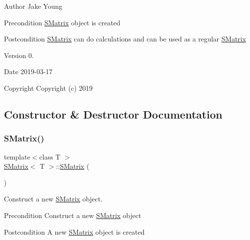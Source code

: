 \begin{DoxyAuthor}{Author}
Jake Young 
\end{DoxyAuthor}
\begin{DoxyPrecond}{Precondition}
\mbox{\hyperlink{class_s_matrix}{S\+Matrix}} object is created 
\end{DoxyPrecond}
\begin{DoxyPostcond}{Postcondition}
\mbox{\hyperlink{class_s_matrix}{S\+Matrix}} can do calculations and can be used as a regular \mbox{\hyperlink{class_s_matrix}{S\+Matrix}} 
\end{DoxyPostcond}
\begin{DoxyVersion}{Version}
0. 
\end{DoxyVersion}
\begin{DoxyDate}{Date}
2019-\/03-\/17
\end{DoxyDate}
\begin{DoxyCopyright}{Copyright}
Copyright (c) 2019 
\end{DoxyCopyright}


\subsection{Constructor \& Destructor Documentation}
\mbox{\label{class_s_matrix_a4c04fdf4ceaf5f5a27694d6dbe825eb5}} 
\subsubsection{\texorpdfstring{SMatrix()}{SMatrix()}\hspace{0.1cm}{\footnotesize\ttfamily [1/4]}}
{\footnotesize\ttfamily template$<$class T $>$ \\
\mbox{\hyperlink{class_s_matrix}{S\+Matrix}}$<$ T $>$\+::\mbox{\hyperlink{class_s_matrix}{S\+Matrix}} (\begin{DoxyParamCaption}{ }\end{DoxyParamCaption})}



Construct a new \mbox{\hyperlink{class_s_matrix}{S\+Matrix}} object. 

\begin{DoxyPrecond}{Precondition}
Construct a new \mbox{\hyperlink{class_s_matrix}{S\+Matrix}} object 
\end{DoxyPrecond}
\begin{DoxyPostcond}{Postcondition}
A new \mbox{\hyperlink{class_s_matrix}{S\+Matrix}} object is created 
\end{DoxyPostcond}
\mbox{\label{class_s_matrix_a89e2f283f0308d52e540e0ae79dd49d3}} 
